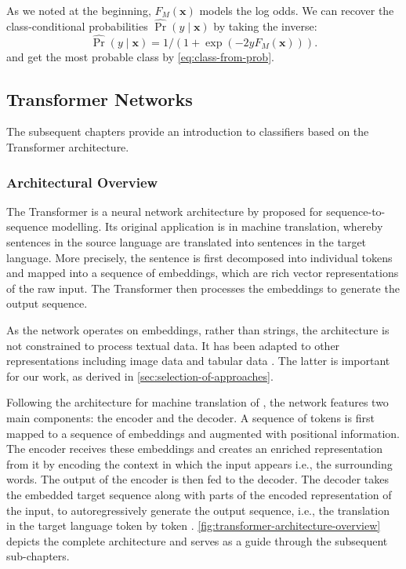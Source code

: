 As we noted at the beginning, $F_M(\mathbf{x})$ models the log odds. We can recover the class-conditional probabilities $\widehat{\operatorname{Pr}}(y \mid \mathbf{x})$ by taking the inverse:
\begin{equation}
    \widehat{\operatorname{Pr}}(y \mid \mathbf{x}) = 1 /\left(1+\exp(-2yF_M(\mathbf{x}))\right).
\end{equation}
and get the most probable class by \cref{eq:class-from-prob}.

\subsection{Transformer Networks}\label{sec:transformer-networks}

The subsequent chapters provide an introduction to classifiers based on the Transformer architecture.

\subsubsection{Architectural Overview}\label{sec:architectural-overview}

The Transformer is a neural network architecture by \textcite[][2--6]{vaswaniAttentionAllYou2017} proposed for sequence-to-sequence modelling. Its original application is in machine translation, whereby sentences in the source language are translated into sentences in the target language. More precisely, the sentence is first decomposed into individual \glspl{token} and mapped into a sequence of \glspl{embedding}, which are rich vector representations of the raw input. The Transformer then processes the \glspl{embedding} to generate the output sequence.

As the network operates on \glspl{embedding}, rather than strings, the architecture is not constrained to process textual data. It has been adapted to other representations including image data \autocites[][2--5]{parmarImageTransformer2018}[][3]{dosovitskiyImageWorth16x162021} and tabular data \autocite[cp.][4]{gorishniyRevisitingDeepLearning2021}. The latter is important for our work, as derived in \cref{sec:selection-of-approaches}.

Following the architecture for machine translation of \textcite[][3]{sutskeverSequenceSequenceLearning2014}, the network features two main components: the encoder and the decoder. A sequence of \glspl{token} is first mapped to a sequence of \glspl{embedding} and augmented with positional information. The encoder receives these \glspl{embedding} and creates an enriched representation from it by encoding the context in which the input appears i.e., the surrounding words. The output of the encoder is then fed to the decoder. The decoder takes the embedded target sequence along with parts of the encoded representation of the input, to autoregressively generate the output sequence, i.e., the translation in the target language \gls{token} by \gls{token} \autocite[][3]{vaswaniAttentionAllYou2017}. \cref{fig:transformer-architecture-overview} depicts the complete architecture and serves as a guide through the subsequent sub-chapters.

